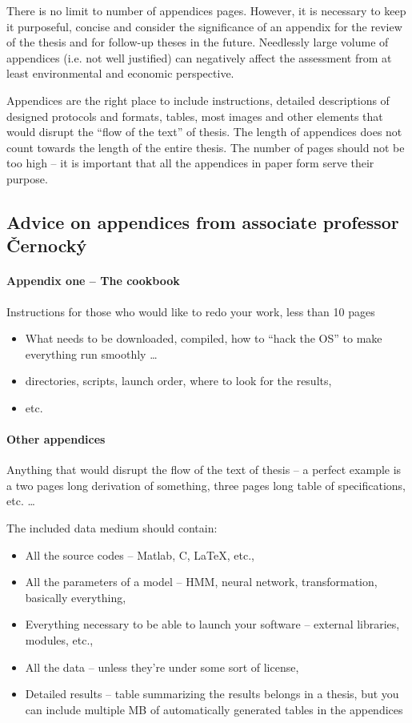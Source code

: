 There is no limit to number of appendices pages. However, it is necessary to keep it purposeful, concise and consider the significance of an appendix for the review of the thesis and for follow-up theses in the future. Needlessly large volume of appendices (i.e. not well justified) can negatively affect the assessment from at least environmental and economic perspective. \cite{fitWeb}

Appendices are the right place to include instructions, detailed descriptions of designed protocols and formats, tables, most images and other elements that would disrupt the ``flow of the text'' of thesis. The length of appendices does not count towards the length of the entire thesis. The number of pages should not be too high -- it is important that all the appendices in paper form serve their purpose.


\subsection{Advice on appendices from associate professor Černocký}

\paragraph{Appendix one -- The cookbook}

Instructions for those who would like to redo your work, less than 10 pages
\begin{itemize}
  \item{What needs to be downloaded, compiled, how to ``hack the OS'' to make everything run smoothly \ldots}
  \item{directories, scripts, launch order, where to look for the results,}
  \item{etc.}
\end{itemize}

\paragraph{Other appendices}

Anything that would disrupt the flow of the text of thesis -- a perfect example is a two pages long derivation of something, three pages long table of specifications, etc. \ldots

The included data medium should contain:
\begin{itemize}
  \item{All the source codes -- Matlab, C, LaTeX, etc.,}
  \item{All the parameters of a model -- HMM, neural network, transformation, basically everything,}
  \item{Everything necessary to be able to launch your software -- external libraries, modules, etc.,}
  \item{All the data -- unless they're under some sort of license,}
  \item{Detailed results -- table summarizing the results belongs in a thesis, but you can include multiple MB of automatically generated tables in the appendices}
\end{itemize}


